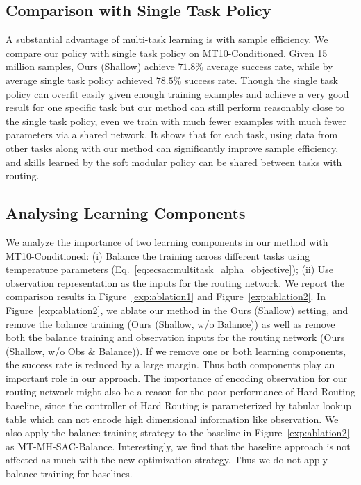 \documentclass{article}
\begin{document}
\vspace{-0.07in}
\subsection{Comparison with Single Task Policy}
\vspace{-0.07in}


A substantial advantage of multi-task learning is with sample efficiency. We compare our policy with single task policy on MT10-Conditioned. Given 15 million samples, Ours (Shallow) achieve $71.8\%$ average success rate, while by average single task policy achieved $78.5\%$ success rate.
Though the single task policy can overfit easily given enough training examples and achieve a very good result for one specific task but our method can still perform reasonably close to the single task policy, even we train with much fewer examples with much fewer parameters via a shared network. It shows that for each task, using data from other tasks along with our method can significantly improve sample efficiency, and skills learned by the soft modular policy can be shared between tasks with routing.

\vspace{-0.07in}
\subsection{Analysing Learning Components}
\vspace{-0.07in}
We analyze the importance of two learning components in our method with MT10-Conditioned: (i) Balance the training across different tasks using temperature parameters (Eq.~\ref{eq:ecsac:multitask_alpha_objective}); (ii) Use observation representation as the inputs for the routing network. 
We report the comparison results in Figure~\ref{exp:ablation1} and Figure~\ref{exp:ablation2}. In Figure~\ref{exp:ablation2}, we ablate our method in the Ours (Shallow) setting, and remove the balance training (Ours (Shallow, w/o Balance)) as well as remove both the balance training and observation inputs for the routing network (Ours (Shallow, w/o Obs $\&$ Balance)).
If we remove one or both learning components, the success rate is reduced by a large margin. Thus both components play an important role in our approach.
The importance of encoding observation for our routing network might also be a reason for the poor performance of Hard Routing baseline, since the controller of Hard Routing is parameterized by tabular lookup table which can not encode high dimensional information like observation.
We also apply the balance training strategy to the baseline
in Figure~\ref{exp:ablation2} as MT-MH-SAC-Balance. Interestingly, we find that the baseline approach is not affected as much with the new optimization strategy. Thus we do not apply balance training for baselines. 
 
\end{document}
